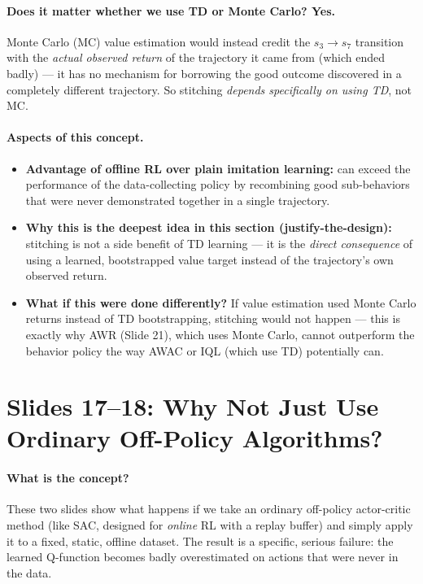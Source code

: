 \documentclass[11pt]{article}
\begin{document}
\paragraph{Does it matter whether we use TD or Monte Carlo? Yes.}
Monte Carlo (MC) value estimation would instead credit the $s_3\to s_7$ transition with
the \emph{actual observed return} of the trajectory it came from (which ended badly) ---
it has no mechanism for borrowing the good outcome discovered in a completely different
trajectory. So stitching \emph{depends specifically on using TD}, not MC.

\paragraph{Aspects of this concept.}
\begin{itemize}
\item \textbf{Advantage of offline RL over plain imitation learning:} can exceed the
performance of the data-collecting policy by recombining good sub-behaviors that were
never demonstrated together in a single trajectory.
\item \textbf{Why this is the deepest idea in this section (justify-the-design):}
stitching is not a side benefit of TD learning --- it is the \emph{direct consequence} of
using a learned, bootstrapped value target instead of the trajectory's own observed
return.
\item \textbf{What if this were done differently?} If value estimation used Monte Carlo
returns instead of TD bootstrapping, stitching would not happen --- this is exactly why
AWR (Slide 21), which uses Monte Carlo, cannot outperform the behavior policy the way
AWAC or IQL (which use TD) potentially can.
\end{itemize}

\section{Slides 17--18: Why Not Just Use Ordinary Off-Policy Algorithms?}

\paragraph{What is the concept?}
These two slides show what happens if we take an ordinary off-policy actor-critic method
(like SAC, designed for \emph{online} RL with a replay buffer) and simply apply it to a
fixed, static, offline dataset. The result is a specific, serious failure: the learned
Q-function becomes badly overestimated on actions that were never in the data.
\end{document}
